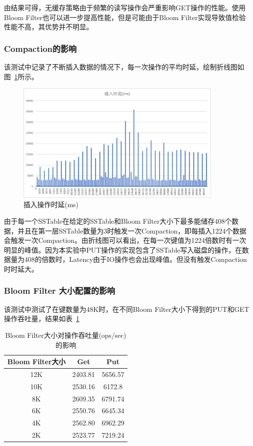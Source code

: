 \documentclass[fontset=windows]{article}
\begin{document}
由结果可得，无缓存策略由于频繁的读写操作会严重影响GET操作的性能。使用Bloom Filter也可以进一步提高性能，但是可能由于Bloom Filter实现导致值检验性能不高，其优势并不明显。

\subsubsection{Compaction的影响}
该测试中记录了不断插入数据的情况下，每一次操作的平均时延，绘制折线图如图~\ref{fig:compaction_test}所示。 \par

\begin{figure}[ht!]
    \centering
    \includegraphics[width=0.9\textwidth]{compaction_test.png}
    \caption{插入操作时延(ms)}
    \label{fig:compaction_test}
\end{figure}

由于每一个SSTable在给定的SSTable和Bloom Filter大小下最多能储存408个数据，并且在第一层SSTable数量为3时触发一次Compaction，即每插入1224个数据会触发一次Compaction。由折线图可以看出，在每一次键值为1224倍数时有一次明显的峰值。因为本实验中PUT操作的实现包含了SSTable写入磁盘的操作，在数据量为408的倍数时，Latency由于IO操作也会出现峰值。但没有触发Compaction时时延大。

\subsubsection{Bloom Filter 大小配置的影响}
该测试中测试了在键数量为48K时，在不同Bloom Filter大小下得到的PUT和GET操作吞吐量，结果如表~\ref{tab:bloom_filter_test}

\begin{table}[ht]
    \centering
    \begin{tabular}{ccc}
        \toprule
        \textbf{Bloom Filter大小} & \textbf{Get} & \textbf{Put} \\
        \midrule
        12K & 2403.81 & 5656.57 \\
        10K & 2530.16 & 6172.8 \\
        8K & 2609.35 & 6791.74 \\
        6K & 2550.76 & 6645.34 \\
        4K & 2562.80 & 6962.29 \\
        2K & 2523.77 & 7219.24 \\
        \bottomrule
    \end{tabular}
    \caption{Bloom Filter大小对操作吞吐量(ops/sec)的影响}
    \label{tab:bloom_filter_test}
\end{table}
\end{document}
